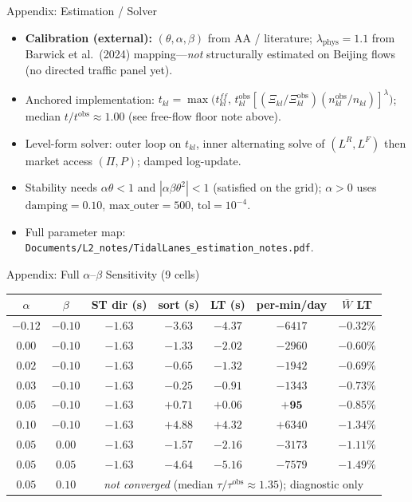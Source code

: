 \documentclass[11pt,aspectratio=169]{beamer}
\newcommand{\back}[1]{\hyperlink{#1}{\beamerreturnbutton{back}}}
\begin{document}
\begin{frame}[label=appestim]{Appendix: Estimation / Solver}
\begin{itemize}\small
  \item \textbf{Calibration (external):} $(\theta,\alpha,\beta)$ from AA / literature; $\lambda_{\mathrm{phys}}=1.1$ from Barwick et al.\ (2024) mapping---\emph{not} structurally estimated on Beijing flows (no directed traffic panel yet).
  \item Anchored implementation: $t_{kl}=\max\big(t_{kl}^{ff},\,t_{kl}^{\mathrm{obs}}[(\Xi_{kl}/\Xi_{kl}^{\mathrm{obs}})(n_{kl}^{\mathrm{obs}}/n_{kl})]^{\lambda}\big)$; median $t/t^{\mathrm{obs}}\approx 1.00$ (see free-flow floor note above).
  \item Level-form solver: outer loop on $t_{kl}$, inner alternating solve of $(L^R,L^F)$ then market access $(\Pi,P)$; damped log-update.
  \item Stability needs $\alpha\theta<1$ and $|\alpha\beta\theta^2|<1$ (satisfied on the grid); $\alpha>0$ uses $\mathrm{damping}=0.10$, $\mathrm{max\_outer}=500$, $\mathrm{tol}=10^{-4}$.
  \item Full parameter map: \texttt{Documents/L2\_notes/TidalLanes\_estimation\_notes.pdf}.
\end{itemize}
\centering\back{data}
\end{frame}

\begin{frame}[label=appgrid]{Appendix: Full $\alpha$--$\beta$ Sensitivity (9 cells)}
\scriptsize
\begin{center}
\begin{tabular}{ccccccc}
\toprule
$\alpha$ & $\beta$ & ST dir (s) & sort (s) & LT (s) & per-min/day & $\bar W$ LT \\
\midrule
$-0.12$ & $-0.10$ & $-1.63$ & $-3.63$ & $-4.37$ & $-6417$ & $-0.32\%$ \\
$0.00$ & $-0.10$ & $-1.63$ & $-1.33$ & $-2.02$ & $-2960$ & $-0.60\%$ \\
$0.02$ & $-0.10$ & $-1.63$ & $-0.65$ & $-1.32$ & $-1942$ & $-0.69\%$ \\
$0.03$ & $-0.10$ & $-1.63$ & $-0.25$ & $-0.91$ & $-1343$ & $-0.73\%$ \\
$\mathbf{0.05}$ & $\mathbf{-0.10}$ & $\mathbf{-1.63}$ & $\mathbf{+0.71}$ & $\mathbf{+0.06}$ & $\mathbf{+95}$ & $\mathbf{-0.85\%}$ \\
$0.10$ & $-0.10$ & $-1.63$ & $+4.88$ & $+4.32$ & $+6340$ & $-1.34\%$ \\
$0.05$ & $0.00$ & $-1.63$ & $-1.57$ & $-2.16$ & $-3173$ & $-1.11\%$ \\
$0.05$ & $0.05$ & $-1.63$ & $-4.64$ & $-5.16$ & $-7579$ & $-1.49\%$ \\
$0.05$ & $0.10$ & \multicolumn{5}{c}{\emph{not converged} (median $\tau/\tau^{\mathrm{obs}}\approx1.35$); diagnostic only} \\
\bottomrule
\end{tabular}
\end{center}
\centering\back{data}
\end{frame}
\end{document}
